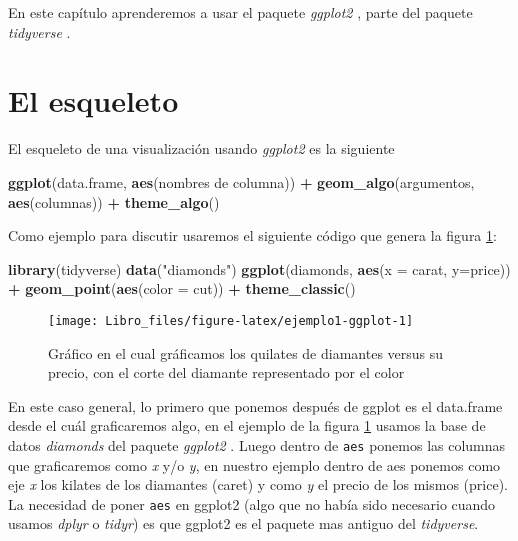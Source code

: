 \documentclass[]{book}
\newenvironment{Shaded}{\begin{snugshade}}{\end{snugshade}}
\newcommand{\DataTypeTok}[1]{\textcolor[rgb]{0.13,0.29,0.53}{#1}}
\newcommand{\KeywordTok}[1]{\textcolor[rgb]{0.13,0.29,0.53}{\textbf{#1}}}
\newcommand{\NormalTok}[1]{#1}
\newcommand{\OperatorTok}[1]{\textcolor[rgb]{0.81,0.36,0.00}{\textbf{#1}}}
\newcommand{\StringTok}[1]{\textcolor[rgb]{0.31,0.60,0.02}{#1}}
\begin{document}
En este capítulo aprenderemos a usar el paquete \emph{ggplot2}
\citep{Wickhamggplot}, parte del paquete \emph{tidyverse}
\citep{Wickhamtidyverse}.

\hypertarget{el-esqueleto}{%
\section{El esqueleto}\label{el-esqueleto}}

El esqueleto de una visualización usando \emph{ggplot2} es la siguiente

\begin{Shaded}
\begin{Highlighting}[]
\KeywordTok{ggplot}\NormalTok{(data.frame, }\KeywordTok{aes}\NormalTok{(nombres de columna)) }\OperatorTok{+}\StringTok{ }\KeywordTok{geom_algo}\NormalTok{(argumentos, }\KeywordTok{aes}\NormalTok{(columnas)) }\OperatorTok{+}\StringTok{ }\KeywordTok{theme_algo}\NormalTok{()}
\end{Highlighting}
\end{Shaded}

Como ejemplo para discutir usaremos el siguiente código que genera la
figura \ref{fig:ejemplo1-ggplot}:

\begin{Shaded}
\begin{Highlighting}[]
\KeywordTok{library}\NormalTok{(tidyverse)}
\KeywordTok{data}\NormalTok{(}\StringTok{"diamonds"}\NormalTok{)}
\KeywordTok{ggplot}\NormalTok{(diamonds, }\KeywordTok{aes}\NormalTok{(}\DataTypeTok{x =}\NormalTok{ carat, }\DataTypeTok{y=}\NormalTok{price)) }\OperatorTok{+}\StringTok{ }\KeywordTok{geom_point}\NormalTok{(}\KeywordTok{aes}\NormalTok{(}\DataTypeTok{color =}\NormalTok{ cut)) }\OperatorTok{+}\StringTok{ }\KeywordTok{theme_classic}\NormalTok{()}
\end{Highlighting}
\end{Shaded}

\begin{figure}

{\centering \texttt{[image: Libro\_files/figure-latex/ejemplo1-ggplot-1]} 

}

\caption{Gráfico en el cual gráficamos los quilates de diamantes versus su precio, con el corte del diamante representado por el color}\label{fig:ejemplo1-ggplot}
\end{figure}

En este caso general, lo primero que ponemos después de ggplot es el
data.frame desde el cuál graficaremos algo, en el ejemplo de la figura
\ref{fig:ejemplo1-ggplot} usamos la base de datos \emph{diamonds} del
paquete \emph{ggplot2} \citep{Wickhamggplot}. Luego dentro de
\texttt{aes} ponemos las columnas que graficaremos como \emph{x} y/o
\emph{y}, en nuestro ejemplo dentro de aes ponemos como eje \emph{x} los
kilates de los diamantes (caret) y como \emph{y} el precio de los mismos
(price). La necesidad de poner \texttt{aes} en ggplot2 (algo que no
había sido necesario cuando usamos \emph{dplyr} o \emph{tidyr}) es que
ggplot2 es el paquete mas antiguo del \emph{tidyverse}.
\end{document}
